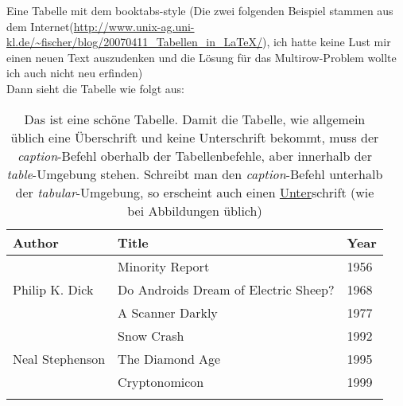 Eine Tabelle mit dem booktabs-style (Die zwei folgenden Beispiel stammen aus dem Internet\linebreak (\url{http://www.unix-ag.uni-kl.de/~fischer/blog/20070411_Tabellen_in_LaTeX/}), ich hatte keine Lust mir einen neuen Text auszudenken und die Lösung für das Multirow-Problem wollte ich auch nicht neu erfinden)\\[1.5ex] %
Dann sieht die Tabelle wie folgt aus:
	
	\begin{table}[H] %
		\caption[Schöne Tabelle]	{Das ist eine schöne Tabelle. Damit die Tabelle, wie allgemein üblich eine Überschrift und keine Unterschrift bekommt, 
															 muss der \emph{caption}-Befehl oberhalb der Tabellenbefehle, aber innerhalb der \emph{table}-Umgebung stehen. 
															 Schreibt man den \emph{caption}-Befehl unterhalb der \emph{tabular}-Umgebung, so erscheint auch einen \underline{Unter}schrift 
															 (wie bei Abbildungen üblich)}
		\begin{center} %
			\begin{tabular}{lll}
				\toprule
					Author & Title & Year 
				\\ \midrule
					\multirow{3}{*}{Philip K. Dick} & Minority Report & 1956 
				\\ \cmidrule{2-3}
		 			& Do Androids Dream of Electric Sheep? & 1968 
				\\ \cmidrule{2-3}
		 			& A Scanner Darkly & 1977 
				\\ \midrule
					\multirow{3}{*}{Neal Stephenson} & Snow Crash & 1992 
				\\ \cmidrule{2-3}
		 			& The Diamond Age & 1995
				\\ \cmidrule{2-3}
		 			& Cryptonomicon & 1999
				\\ \bottomrule\\
			\end{tabular}
		\end{center}
	\end{table} 
	
